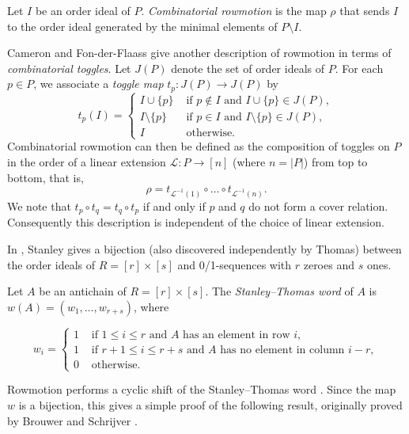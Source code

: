 \documentclass[ALCO,Unicode,published]{cedram}
\numberwithin{equation}{section}
\begin{document}
\begin{Def}
Let $I$ be an order ideal of $P$. \textit{Combinatorial rowmotion} is the map $\rho$ that sends $I$ to the order ideal generated by the minimal elements of $P \setminus I$.
\end{Def}

Cameron and Fon-der-Flaass \cite{cameronfonderflaass} give another description of rowmotion in terms of \textit{combinatorial toggles}. Let $J(P)$ denote the set of order ideals of $P$. For each $p \in P$, we associate a \emph{toggle map} $t_p \colon J(P) \to J(P)$ by
\[t_p(I) = \begin{cases} I \cup \{p\} &\text{ if } p \not\in I \text{ and } I \cup \{p\} \in J(P), \\
I \setminus \{p\} &\text{ if } p \in I \text{ and } I \setminus \{p\} \in J(P), \\
I &\text{ otherwise.} \end{cases}\]
Combinatorial rowmotion can then be defined as the composition of toggles on $P$ in the order of a linear extension $\mathcal L \colon P \to [n]$ (where $n=|P|$) from top to bottom, that is,
\[\rho = t_{\mathcal{L}^{-1}(1)} \circ \dots \circ t_{\mathcal{L}^{-1}(n)}.\]
We note that $t_p \circ t_q = t_q \circ t_p$ if and only if $p$ and $q$ do not form a cover relation. Consequently this description is independent of the choice of linear extension.

In \cite{stanley1}, Stanley gives a bijection (also discovered independently by Thomas) between the order ideals of $R = [r] \times [s]$ and 0/1-sequences with $r$ zeroes and $s$ ones.

\begin{Def}
Let $A$ be an antichain of $R = [r] \times [s]$. The \emph{Stanley--Thomas word} of $A$ is $w(A) = (w_1, \dots, w_{r+s})$, where

\[w_i = \begin{cases} 1 &\text{ if } 1\leq i \leq r \text{ and } A \text{ has an element in row } i, \\ 
1 &\text{ if } r+1 \leq i \leq r+s \text{ and } A \text{ has no element in column } i-r, \\ 
0 &\text{ otherwise.} \end{cases}\]
\end{Def}

Rowmotion performs a cyclic shift of the Stanley--Thomas word \cite{propproby}. Since the map $w$ is a bijection, this gives a simple proof of the following result, originally proved by %
Brouwer and Schrijver \cite{brouwerschrijver}.
\end{document}
